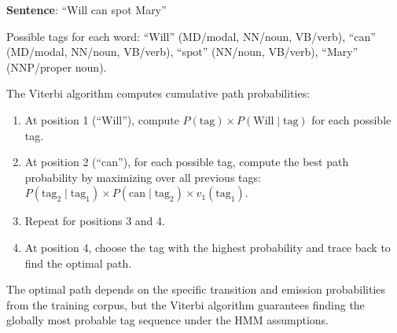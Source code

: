 \documentclass[11pt,a4paper]{article}
\begin{document}
\begin{tcolorbox}[colback=green!5!white,colframe=green!75!black,title=\textbf{Numerical: HMM Tagging with Viterbi}]
\textbf{Sentence}: ``Will can spot Mary''

Possible tags for each word: ``Will'' (MD/modal, NN/noun, VB/verb), ``can'' (MD/modal, NN/noun, VB/verb), ``spot'' (NN/noun, VB/verb), ``Mary'' (NNP/proper noun).

The Viterbi algorithm computes cumulative path probabilities:
\begin{enumerate}
    \item At position 1 (``Will''), compute $P(\text{tag}) \times P(\text{Will} \mid \text{tag})$ for each possible tag.
    \item At position 2 (``can''), for each possible tag, compute the best path probability by maximizing over all previous tags: $P(\text{tag}_2 \mid \text{tag}_1) \times P(\text{can} \mid \text{tag}_2) \times v_1(\text{tag}_1)$.
    \item Repeat for positions 3 and 4.
    \item At position 4, choose the tag with the highest probability and trace back to find the optimal path.
\end{enumerate}

The optimal path depends on the specific transition and emission probabilities from the training corpus, but the Viterbi algorithm guarantees finding the globally most probable tag sequence under the HMM assumptions.
\end{tcolorbox}
\end{document}
